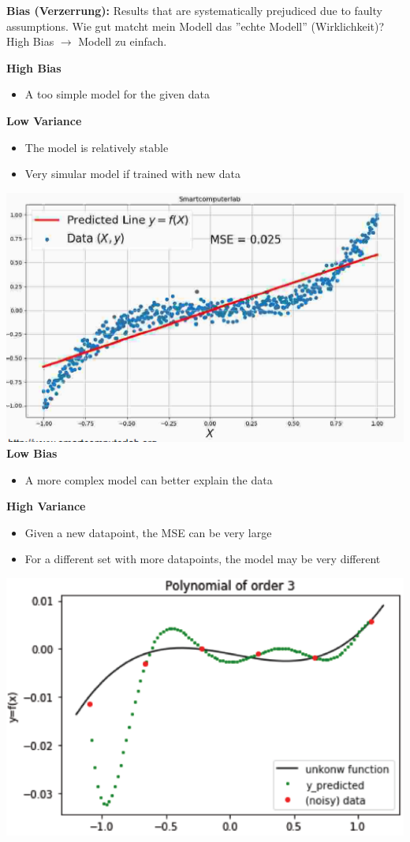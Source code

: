 \textbf{Bias (Verzerrung):} Results that are systematically prejudiced due to faulty assumptions. Wie gut matcht mein Modell das ''echte Modell'' (Wirklichkeit)? High Bias $\rightarrow$ Modell zu einfach.

\textbf{High Bias}
\begin{itemize}
    \item A too simple model for the given data
\end{itemize}
\textbf{Low Variance}
\begin{itemize}
    \item The model is relatively stable
    \item Very simular model if trained with new data
\end{itemize}
\includegraphics[width=0.6\linewidth]{./img/bias_variance.png}\\
\textbf{Low Bias}
\begin{itemize}
    \item A more complex model can better explain the data
\end{itemize}
\textbf{High Variance}
\begin{itemize}
    \item Given a new datapoint, the MSE can be very large
    \item For a different set with more datapoints, the model may be very different
\end{itemize}
\includegraphics[width=0.6\linewidth]{./img/bias_variance2.png}

